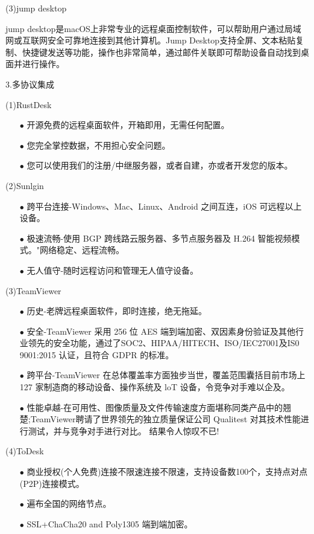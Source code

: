 \documentclass[a4paper,twoside]{scrbook}
\begin{document}
\begin{CJK}{UTF8}{gbsn}
(3)jump desktop

jump desktop是macOS上非常专业的远程桌面控制软件，可以帮助用户通过局域网或互联网安全可靠地连接到其他计算机。Jump Desktop支持全屏、文本粘贴复制、快捷键发送等功能，操作也非常简单，通过邮件关联即可帮助设备自动找到桌面并进行操作。

3.多协议集成

(1)RustDesk
\begin{itemize}
\item[$\bullet$]开源免费的远程桌面软件，开箱即用，无需任何配置。
\item[$\bullet$]您完全掌控数据，不用担心安全问题。
\item[$\bullet$]您可以使用我们的注册/中继服务器，或者自建，亦或者开发您的版本。
\end{itemize}

(2)Sunlgin
\begin{itemize}
\item[$\bullet$]跨平台连接-Windows、Mac、Linux、Android 之间互连，iOS 可远程以上设备。
\item[$\bullet$]极速流畅-使用 BGP 跨线路云服务器、多节点服务器及 H.264 智能视频模式。"网络稳定、远程流畅。
\item[$\bullet$]无人值守-随时远程访问和管理无人值守设备。
\end{itemize}

(3)TeamViewer
\begin{itemize}
\item[$\bullet$]历史-老牌远程桌面软件，即时连接，绝无拖延。
\item[$\bullet$]安全-TeamViewer 采用 256 位 AES 端到端加密、双因素身份验证及其他行业领先的安全功能，通过了SOC2、HIPAA/HITECH、ISO/IEC27001及IS0 9001:2015 认证，且符合 GDPR 的标准。
\item[$\bullet$]跨平台-TeamViewer 在总体覆盖率方面独步当世，覆盖范围囊括目前市场上 127 家制造商的移动设备、操作系统及 loT 设备，令竞争对手难以企及。
\item[$\bullet$]性能卓越-在可用性、图像质量及文件传输速度方面堪称同类产品中的翘楚;TeamViewer聘请了世界领先的独立质量保证公司 Qualitest 对其技术性能进行测试，并与竞争对手进行对比。 结果令人惊叹不已!
\end{itemize}

(4)ToDesk
\begin{itemize}
\item[$\bullet$]商业授权(个人免费)连接不限速连接不限速，支持设备数100个，支持点对点(P2P)连接模式。
\item[$\bullet$]遍布全国的网络节点。
\item[$\bullet$]SSL+ChaCha20 and Poly1305 端到端加密。
\end{itemize}


\end{CJK}
\end{document}
